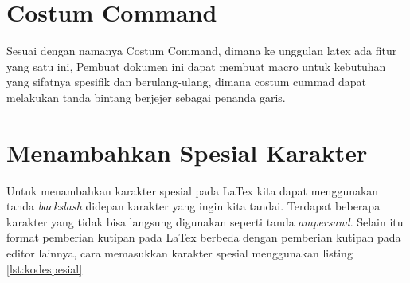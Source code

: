 \section{Costum Command}
Sesuai  dengan  namanya Costum Command, dimana ke unggulan latex ada fitur yang satu ini, Pembuat dokumen ini dapat  membuat macro untuk kebutuhan yang sifatnya spesifik dan berulang-ulang, dimana costum cummad dapat melakukan tanda bintang berjejer sebagai penanda garis.

\section{Menambahkan Spesial Karakter}
Untuk menambahkan karakter spesial pada LaTex kita dapat menggunakan tanda \textit{backslash} didepan karakter yang ingin kita tandai. Terdapat beberapa karakter yang tidak bisa langsung digunakan seperti tanda \textit{ampersand}. Selain itu format pemberian kutipan pada LaTex berbeda dengan pemberian kutipan pada editor lainnya, cara memasukkan karakter spesial menggunakan listing \ref{lst:kodespesial}



